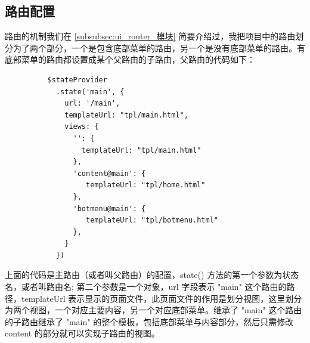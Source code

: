 \documentclass[UTF8]{ctexbook}
\begin{document}
    \subsection{路由配置}
      \label{subsec:路由配置}
        路由的机制我们在 \ref{subsubsec:ui_router_模块} 简要介绍过，我把项目中的路由划分为了两个部分，一个是包含底部菜单的路由，另一个是没有底部菜单的路由。有底部菜单的路由都设置成某个父路由的子路由，父路由的代码如下：
        \begin{lstlisting}
          $stateProvider
            .state('main', {
              url: '/main',
              templateUrl: "tpl/main.html",
              views: {
                '': {
                  templateUrl: "tpl/main.html"
                },
                'content@main': {
                   templateUrl: "tpl/home.html"
                },
                'botmenu@main': {
                   templateUrl: "tpl/botmenu.html"
                },
              }
            })
        \end{lstlisting}
          上面的代码是主路由（或者叫父路由）的配置，state() 方法的第一个参数为状态名，或者叫路由名; 第二个参数是一个对象，url 字段表示 "main" 这个路由的路径，templateUrl 表示显示的页面文件，此页面文件的作用是划分视图，这里划分为两个视图，一个对应主要内容，另一个对应底部菜单。继承了 "main" 这个路由的子路由继承了 "main" 的整个模板，包括底部菜单与内容部分，然后只需修改 content 的部分就可以实现子路由的视图。
\end{document}
